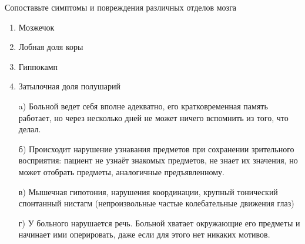 
Сопоставьте симптомы и повреждения различных отделов мозга

\begin{enumerate}
    \item Мозжечок
    \item Лобная доля коры
    \item Гиппокамп
    \item Затылочная доля полушарий
\end{enumerate}

\begin{enumerate}
    \item[a)] Больной ведет себя вполне адекватно, его кратковременная память работает, но через несколько дней не может ничего вспомнить из того, что делал.
    \item[б)] Происходит нарушение узнавания предметов при сохранении зрительного восприятия: пациент не узнаёт знакомых предметов, не знает их значения, но может отобрать предметы, аналогичные предъявленному.
    \item[в)] Мышечная гипотония, нарушения координации, крупный тонический спонтанный нистагм (непроизвольные частые колебательные движения глаз)
    \item[г)] У больного нарушается речь. Больной хватает окружающие его предметы и начинает ими оперировать, даже если для этого нет никаких мотивов.
\end{enumerate}


